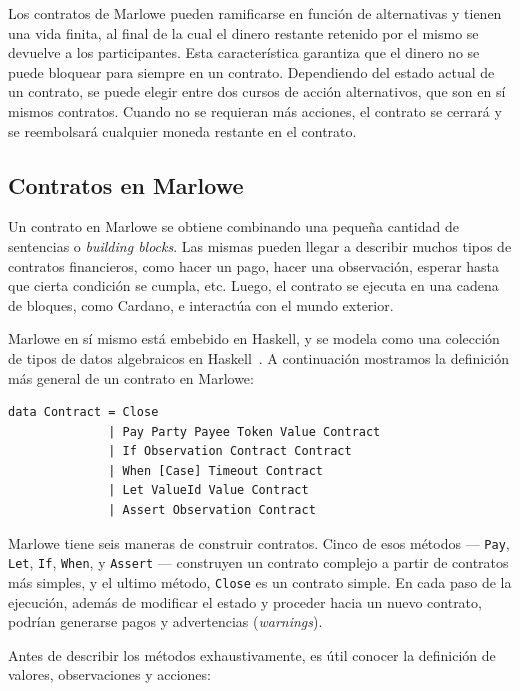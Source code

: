 \documentclass[12pt]{book}
\begin{document}
Los contratos de Marlowe pueden ramificarse en función de alternativas y tienen una vida finita, al final de la cual el dinero restante retenido por el mismo se devuelve a los participantes. Esta característica garantiza que el dinero no se puede bloquear para siempre en un contrato. Dependiendo del estado actual de un contrato, se puede elegir entre dos cursos de acción alternativos, que son en sí mismos contratos. Cuando no se requieran más acciones, el contrato se cerrará y se reembolsará cualquier moneda restante en el contrato.

\subsection{Contratos en Marlowe}\label{sec:Contratos_en_marlowe}
Un contrato en Marlowe se obtiene combinando una pequeña cantidad de sentencias o \textit{building blocks}. Las mismas pueden llegar a describir muchos tipos de contratos financieros, como hacer un pago, hacer una observación, esperar hasta que cierta condición se cumpla, etc. Luego, el contrato se ejecuta en una cadena de bloques, como Cardano, e interactúa con el mundo exterior.

Marlowe en sí mismo está embebido en Haskell, y se modela como una colección de tipos de datos algebraicos en Haskell~\cite{Algebraic_data_type}. A continuación mostramos la definición más general de un contrato en Marlowe:

\begin{lstlisting}[language=Marlowe]
data Contract = Close
              | Pay Party Payee Token Value Contract
              | If Observation Contract Contract
              | When [Case] Timeout Contract
              | Let ValueId Value Contract
              | Assert Observation Contract
\end{lstlisting}

Marlowe tiene seis maneras de construir contratos. Cinco de esos métodos ---
\texttt{Pay}, \texttt{Let}, \texttt{If}, \texttt{When}, y \texttt{Assert} --- construyen un contrato complejo a partir de contratos más simples, y el ultimo método, \texttt{Close} es un contrato simple. En cada paso de la ejecución, además de modificar el estado y proceder hacia un nuevo contrato, podrían generarse pagos y advertencias (\textit{warnings}).

Antes de describir los métodos exhaustivamente, es útil conocer la definición de valores, observaciones y acciones:
\end{document}
